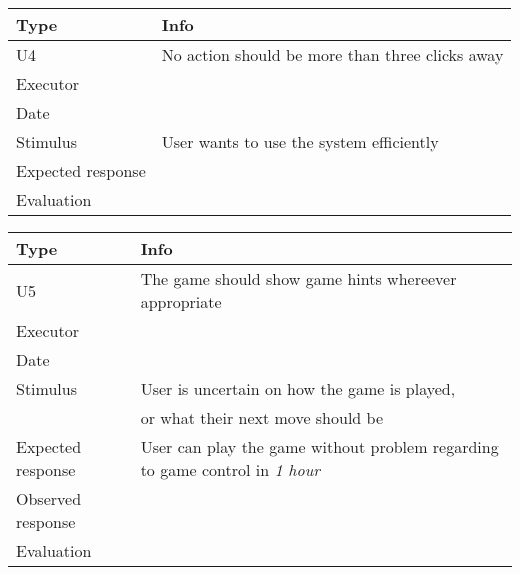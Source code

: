 \vspace{0.5em}

\noindent
\begin{tabular}{|p{2cm}|p{10cm}|}
	\hline
	\bf{Type}	& \bf{Info} \\
	\hline
	U4			& No action should be more than three clicks away \\
	Executor	&  \\
	Date		& \date{\today} \\
	Stimulus	& User wants to use the system efficiently \\
	Expected response &  \\
	Evaluation	&  \\
	\hline
\end{tabular}

\vspace{0.5em}

\noindent
\begin{tabular}{|p{2cm}|p{10cm}|}
	\hline
	\bf{Type}	& \bf{Info} \\
	\hline
	U5			& The game should show game hints whereever appropriate \\
	Executor	&  \\
	Date		& \date{\today} \\
	Stimulus	& User is uncertain on how the game is played, \\
             & or what their next move should be \\
	Expected response & User can play the game without problem regarding to game control in \emph{1 hour}\\
	Observed response & \\
	Evaluation	&  \\
	\hline
\end{tabular}
